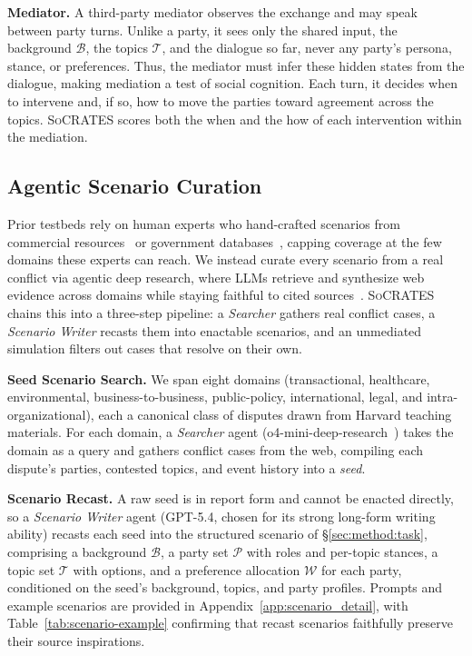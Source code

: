 \documentclass{llmxive}
\providecommand{\algname}{\textsc{SoCRATES}}
\begin{document}
\smallskip\smallskip\noindent\textbf{{Mediator.}}
A third-party mediator observes the exchange and may speak between party turns. Unlike a party, it sees only the shared input, the background $\mathcal{B}$, the topics $\mathcal{T}$, and the dialogue so far, never any party's persona, stance, or preferences. Thus, the mediator must infer these hidden states from the dialogue, making mediation a test of social cognition. Each turn, it decides when to intervene and, if so, how to move the parties toward agreement across the topics. \algname{} scores both the when and the how of each intervention within the mediation.

\subsection{Agentic Scenario Curation}
\label{sec:method:construction}

Prior testbeds rely on human experts who hand-crafted scenarios from commercial resources~\citep{liu2025promediate} or government databases~\citep{chen2026simulating}, capping coverage at the few domains these experts can reach. We instead curate every scenario from a real conflict via agentic deep research, where LLMs retrieve and synthesize web evidence across domains while staying faithful to cited sources~\citep{gou2026mind2web, tao2025webshaper}. \algname{} chains this into a three-step pipeline: a \textit{Searcher} gathers real conflict cases, a \textit{Scenario Writer} recasts them into enactable scenarios, and an unmediated simulation filters out cases that resolve on their own.

\smallskip\smallskip\noindent\textbf{{Seed Scenario Search.}}
We span eight domains (transactional, healthcare, environmental, business-to-business, public-policy, international, legal, and intra-organizational), each a canonical class of disputes drawn from Harvard teaching materials. For each domain, a \textit{Searcher} agent (o4-mini-deep-research~\citep{openai2025deepresearch}) takes the domain as a query and gathers conflict cases from the web, compiling each dispute's parties, contested topics, and event history into a \emph{seed}.

\smallskip\smallskip\noindent\textbf{{Scenario Recast.}}
A raw seed is in report form and cannot be enacted directly, so a \textit{Scenario Writer} agent (GPT-5.4, chosen for its strong long-form writing ability) recasts each seed into the structured scenario of \S\ref{sec:method:task}, comprising a background $\mathcal{B}$, a party set $\mathcal{P}$ with roles and per-topic stances, a topic set $\mathcal{T}$ with options, and a preference allocation $\mathcal{W}$ for each party, conditioned on the seed's background, topics, and party profiles. Prompts and example scenarios are provided in Appendix~\ref{app:scenario_detail}, with Table~\ref{tab:scenario-example} confirming that recast scenarios faithfully preserve their source inspirations.
\end{document}

